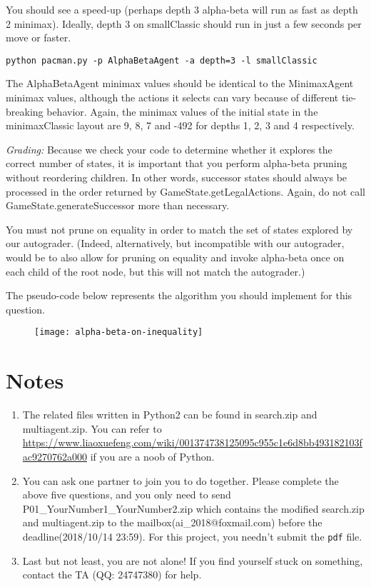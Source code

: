 \documentclass[a4paper, 11pt]{article}
\begin{document}
You should see a speed-up (perhaps depth 3 alpha-beta will run as fast as depth 2 minimax). Ideally, depth 3 on \textsf{smallClassic} should run in just a few seconds per move or faster.

\texttt{python pacman.py -p AlphaBetaAgent -a depth=3 -l smallClassic}

The \textsf{AlphaBetaAgent} minimax values should be identical to the \textsf{MinimaxAgent} minimax values, although the actions it selects can vary because of different tie-breaking behavior. Again, the minimax values of the initial state in the \textsf{minimaxClassic} layout are 9, 8, 7 and -492 for depths 1, 2, 3 and 4 respectively.

\textit{Grading:} Because we check your code to determine whether it explores the correct number of states, it is important that you perform alpha-beta pruning without reordering children. In other words, successor states should always be processed in the order returned by \textsf{GameState.getLegalActions}. Again, do not call \textsf{GameState.generateSuccessor} more than necessary.

You must not prune on equality in order to match the set of states explored by our autograder. (Indeed, alternatively, but incompatible with our autograder, would be to also allow for pruning on equality and invoke alpha-beta once on each child of the root node, but this will not match the autograder.)

The pseudo-code below represents the algorithm you should implement for this question.
\begin{figure}[h]
  \centering
  \texttt{[image: alpha-beta-on-inequality]}
\end{figure}
\section{Notes}
\begin{enumerate}\setlength{\itemsep}{-\itemsep}
  \item The related files written in Python2 can be found in \textsf{search.zip} and \textsf{multiagent.zip}. You can refer to \url{https://www.liaoxuefeng.com/wiki/001374738125095c955c1e6d8bb493182103fac9270762a000} if you are a noob of Python.
\item You can ask one partner to join you to do together. Please complete the above five questions, and you only need to send \textsf{P01\_YourNumber1\_YourNumber2.zip} which contains the modified \textsf{search.zip} and \textsf{multiagent.zip} to the mailbox(\textsf{ai\_2018@foxmail.com}) before the deadline(2018/10/14 23:59). For this project, you needn't submit the \texttt{pdf} file.
\item Last but not least, you are not alone! If you find yourself stuck on something, contact the TA (QQ: 24747380) for help.
  
\end{enumerate}
  
%
%
\end{document}
